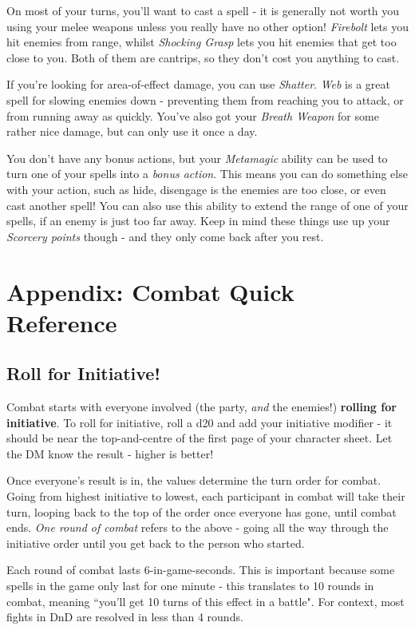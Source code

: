 \documentclass[10pt,a4paper]{article}
\begin{document}
On most of your turns, you'll want to cast a spell - it is generally not worth you using your melee weapons unless you really have no other option!
\emph{Firebolt} lets you hit enemies from range, whilst \emph{Shocking Grasp} lets you hit enemies that get too close to you.
Both of them are cantrips, so they don't cost you anything to cast.

If you're looking for area-of-effect damage, you can use \emph{Shatter}.
\emph{Web} is a great spell for slowing enemies down - preventing them from reaching you to attack, or from running away as quickly.
You've also got your \emph{Breath Weapon} for some rather nice damage, but can only use it once a day.

You don't have any bonus actions, but your \emph{Metamagic} ability can be used to turn one of your spells into a \emph{bonus action}.
This means you can do something else with your action, such as hide, disengage is the enemies are too close, or even cast another spell!
You can also use this ability to extend the range of one of your spells, if an enemy is just too far away.
Keep in mind these things use up your \emph{Scorcery points} though - and they only come back after you rest.

\newpage

\section{Appendix: Combat Quick Reference}

\subsection{Roll for Initiative!}

Combat starts with everyone involved (the party, \emph{and} the enemies!) \textbf{rolling for initiative}.
To roll for initiative, roll a d20 and add your initiative modifier - it should be near the top-and-centre of the first page of your character sheet.
Let the DM know the result - higher is better!

Once everyone's result is in, the values determine the turn order for combat.
Going from highest initiative to lowest, each participant in combat will take their turn, looping back to the top of the order once everyone has gone, until combat ends.
\emph{One round of combat} refers to the above - going all the way through the initiative order until you get back to the person who started.

Each round of combat lasts 6-in-game-seconds.
This is important because some spells in the game only last for one minute - this translates to 10 rounds in combat, meaning ``you'll get 10 turns of this effect in a battle".
For context, most fights in DnD are resolved in less than 4 rounds.
\end{document}
